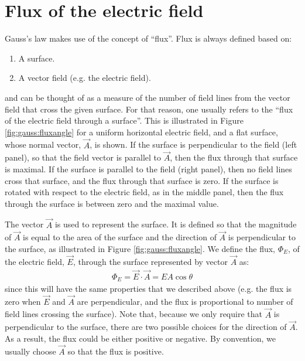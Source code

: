 \section{Flux of the electric field}
\label{sec:gauss:flux}
Gauss's law makes use of the concept of ``flux''. Flux is always defined based on:
\begin{enumerate}
\item A surface.
\item A vector field (e.g. the electric field). 
\end{enumerate}
and can be thought of as a measure of the number of field lines from the vector field that cross the given surface. For that reason, one usually refers to the ``flux of the electric field through a surface''. This is illustrated in Figure \ref{fig:gauss:fluxangle} for a uniform horizontal electric field, and a flat surface, whose normal vector, $\vec A$, is shown. If the surface is perpendicular to the field (left panel), so that the field vector is parallel to $\vec A$, then the flux through that surface is maximal. If the surface is parallel to the field (right panel), then no field lines cross that surface, and the flux through that surface is zero. If the surface is rotated with respect to the electric field, as in the middle panel, then the flux through the surface is between zero and the maximal value.


The vector $\vec A$ is used to represent the surface. It is defined so that the magnitude of $\vec A$ is equal to the area of the surface and the direction of $\vec A$ is perpendicular to the surface, as illustrated in Figure \ref{fig:gauss:fluxangle}. We define the flux, $\Phi_E$, of the electric field, $\vec E$, through the surface represented by vector $\vec A$ as:
\begin{align*}
\Phi_E=\vec E\cdot \vec A=EA\cos\theta
\end{align*}
since this will have the same properties that we described above (e.g. the flux is zero when $\vec E$ and $\vec A$ are perpendicular, and the flux is proportional to number of field lines crossing the surface). Note that, because we only require that $\vec A$ is perpendicular to the surface, there are two possible choices for the direction of $\vec A$. As a result, the flux could be either positive or negative. By convention, we usually choose $\vec A$ so that the flux is positive.

